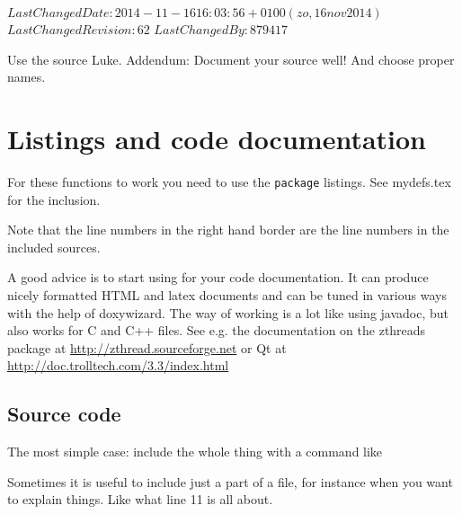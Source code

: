 %
{$LastChangedDate: 2014-11-16 16:03:56 +0100 (zo, 16 nov 2014) $}%
{$LastChangedRevision: 62 $}%
{$LastChangedBy: 879417 $}
\renewcommand\TheFile{codelistings.tex}

\begin{savequote}[8cm]
  \sffamily
  Use the source Luke.
  Addendum: Document your source well! And choose proper names.
\end{savequote}
\chapter{Listings and code documentation}
For these functions to work you need to use the \texttt{package} listings.
See mydefs.tex for the inclusion.


Note that the line numbers in the right hand border are the line
numbers in the included sources.

A good advice is to start using  for your code documentation.
It can produce nicely formatted HTML and latex documents and can be
tuned in various ways with the  
help of doxywizard. The way of working is a lot like using javadoc,
but also works for C and C++ files. 
See e.g. the documentation on the zthreads package at
\url{http://zthread.sourceforge.net} or Qt at 
\url{http://doc.trolltech.com/3.3/index.html}

\section{Source code}
The most simple case: include the whole thing with a command like \\
\verb##


Sometimes it is useful to include just a part of a file, for instance
when you want to explain things. Like what line 11 is all about.\\
\verb##


